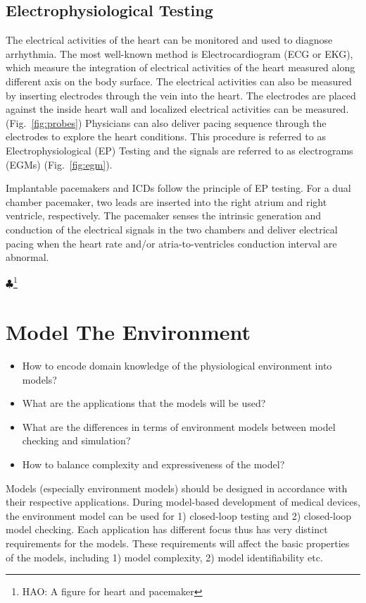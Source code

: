 \documentclass[openany]{now} %
\newcommand{\figref}[1]{Fig.~\ref{fig:#1}}
\newcommand{\Hao}[1]{$\clubsuit$\footnote{HAO: #1}}
\begin{document}
\section{Electrophysiological Testing}
The electrical activities of the heart can be monitored and used to diagnose arrhythmia. The most well-known method is Electrocardiogram (ECG or EKG), which measure the integration of electrical activities of the heart measured along different axis on the body surface. The electrical activities can also be measured by inserting electrodes through the vein into the heart. The electrodes are placed against the inside heart wall and localized electrical activities can be measured. (\figref{probes}) Physicians can also deliver pacing sequence through the electrodes to explore the heart conditions. This procedure is referred to as Electrophysiological (EP) Testing and the signals are referred to as electrograms (EGMs) (\figref{egm}). 

Implantable pacemakers and ICDs follow the principle of EP testing. For a dual chamber pacemaker, two leads are inserted into the right atrium and right ventricle, respectively. The pacemaker senses the intrinsic generation and conduction of the electrical signals in the two chambers and deliver electrical pacing when the heart rate and/or atria-to-ventricles conduction interval are abnormal.

\Hao{A figure for heart and pacemaker}

\chapter{Model The Environment}
\begin{itemize}
	\item How to encode domain knowledge of the physiological environment into models?
    \item What are the applications that the models will be used?
    \item What are the differences in terms of environment models between model checking and simulation?
    \item How to balance complexity and expressiveness of the model?
\end{itemize}
Models (especially environment models) should be designed in accordance with their respective applications. During model-based development of medical devices, the environment model can be used for 1) closed-loop testing and 2) closed-loop model checking. Each application has different focus thus has very distinct requirements for the models. These requirements will affect the basic properties of the models, including 1) model complexity, 2) model identifiability etc. 
\end{document}
